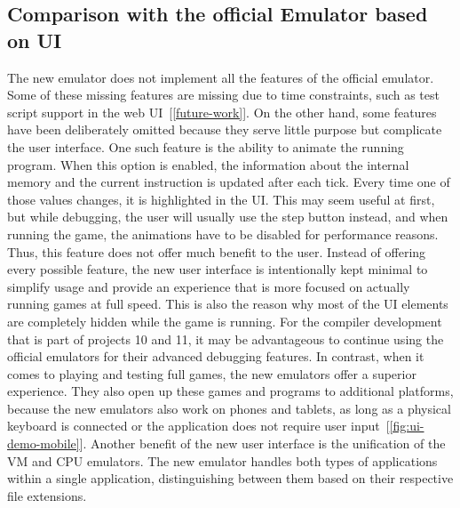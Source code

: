 
\subsection{Comparison with the official Emulator based on UI} \label{ui-compatibility}
The new emulator does not implement all the features of the official emulator.
Some of these missing features are missing due to time constraints, such as test script support in the web UI~[\ref{future-work}].
On the other hand, some features have been deliberately omitted because they serve little purpose but complicate the user interface.
One such feature is the ability to animate the running program.
When this option is enabled, the information about the internal memory and the current instruction is updated after each tick.
Every time one of those values changes, it is highlighted in the UI.
This may seem useful at first, but while debugging, the user will usually use the step button instead, and when running the game, the animations have to be disabled for performance reasons.
Thus, this feature does not offer much benefit to the user.
Instead of offering every possible feature, the new user interface is intentionally kept minimal to simplify usage and provide an experience that is more focused on actually running games at full speed.
This is also the reason why most of the UI elements are completely hidden while the game is running.
For the compiler development that is part of projects 10 and 11, it may be advantageous to continue using the official emulators for their advanced debugging features.
In contrast, when it comes to playing and testing full games, the new emulators offer a superior experience.
They also open up these games and programs to additional platforms, because the new emulators also work on phones and tablets, as long as a physical keyboard is connected or the application does not require user input~[\ref{fig:ui-demo-mobile}].
Another benefit of the new user interface is the unification of the VM and CPU emulators.
The new emulator handles both types of applications within a single application, distinguishing between them based on their respective file extensions.

